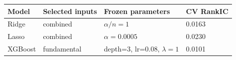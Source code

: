 \begin{tabular}{llll}
\toprule
Model & Selected inputs & Frozen parameters & CV RankIC \\
\midrule
Ridge & combined & $\alpha/n=1$ & 0.0163 \\
Lasso & combined & $\alpha=0.0005$ & 0.0230 \\
XGBoost & fundamental & depth=3, lr=0.08, $\lambda=1$ & 0.0101 \\
\bottomrule
\end{tabular}
